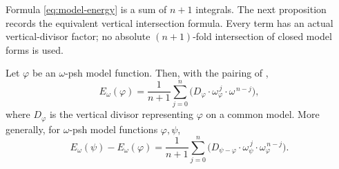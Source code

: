 Formula \eqref{eq:model-energy} is a sum of $n+1$ integrals.  The next
proposition records the equivalent vertical intersection formula.  Every
term has an actual vertical-divisor factor; no absolute
$(n+1)$-fold intersection of closed model forms is used.

\begin{proposition}
\label{prop:ch26-energy-intersection}
Let $\varphi$ be an $\omega$-psh model function.  Then, with the pairing
of ,
\begin{equation}
\label{eq:ch26-energy-intersection}
 E_\omega(\varphi)
 =\frac1{n+1}\sum_{j=0}^n
   \bigl(D_\varphi\cdot\omega_\varphi^{\,j}\cdot
                         \omega^{\,n-j}\bigr),
\end{equation}
where $D_\varphi$ is the vertical divisor representing $\varphi$ on a
common model.
More generally, for $\omega$-psh model functions $\varphi,\psi$,
\begin{equation}
\label{eq:ch26-energy-difference-intersection}
 E_\omega(\psi)-E_\omega(\varphi)
 =\frac1{n+1}\sum_{j=0}^n
   \bigl(D_{\psi-\varphi}\cdot\omega_\psi^{\,j}\cdot
                         \omega_\varphi^{\,n-j}\bigr).
\end{equation}
\end{proposition}

